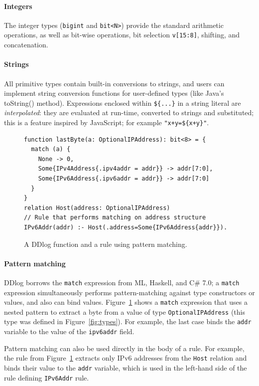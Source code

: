\paragraph{Integers} The integer types (\texttt{bigint} and \texttt{bit<N>}) provide the
standard arithmetic operations, as well as bit-wise operations, bit
selection \texttt{v[15:8]}, shifting, and concatenation.

\paragraph{Strings} All primitive types contain built-in conversions to strings, and users
can implement string conversion functions for user-defined types (like
Java's toString() method).  Expressions enclosed within
\texttt{\$\{...\}} in a string literal are \emph{interpolated}: they
are evaluated at run-time, converted to strings and substituted; this
is a feature inspired by JavaScript; for example
\texttt{"x+y=\$\{x+y\}"}.

\begin{figure}[t]
  \footnotesize
  \begin{lstlisting}[language=ddlog]
function lastByte(a: OptionalIPAddress): bit<8> = {
  match (a) {
    None -> 0,
    Some{IPv4Address{.ipv4addr = addr}} -> addr[7:0],
    Some{IPv6Address{.ipv6addr = addr}} -> addr[7:0]
  }
}
relation Host(address: OptionalIPAddress)
// Rule that performs matching on address structure
IPv6Addr(addr) :- Host(.address=Some{IPv6Address{addr}}).
  \end{lstlisting}
\caption{A DDlog function and a rule using pattern
  matching.\label{fig:function}}
\end{figure}

\paragraph{Pattern matching}  DDlog borrows
the \texttt{match} expression from ML, Haskell, and C\# 7.0; a
\texttt{match} expression simultaneously performs pattern-matching
against type constructors or values, and also can bind values.
Figure~\ref{fig:function} shows a \texttt{match} expression that uses
a nested pattern to extract a byte from a value of type
\texttt{OptionalIPAddress} (this type was defined in
Figure~\ref{fig:types}).  For example, the last case binds the
\texttt{addr} variable to the value of the \texttt{ipv6addr} field.

Pattern matching can also be used directly in the body of a rule.  For
example, the rule from Figure~\ref{fig:function} extracts only IPv6
addresses from the \texttt{Host} relation and binds their value to the
\texttt{addr} variable, which is used in the left-hand side of the
rule defining \texttt{IPv6Addr} rule.

